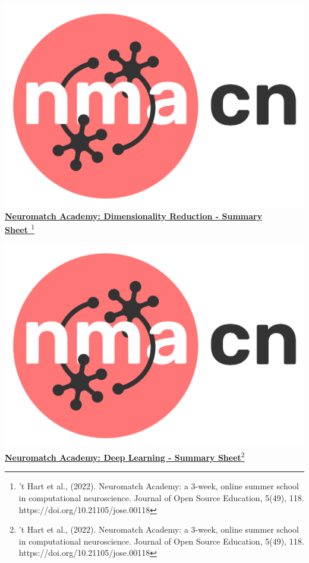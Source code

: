 \documentclass[10pt,a4paper]{article}
\begin{document}
\begin{multicols}{3}

\end{multicols}
\includegraphics[scale=0.03]{Figures/NMACN.png}\href{https://compneuro.neuromatch.io/tutorials/intro.html}{\textbf{\Huge{Neuromatch Academy: Dimensionality Reduction - Summary\\ Sheet }}\footnote{’t Hart et al., (2022). Neuromatch Academy: a 3-week, online summer school in computational neuroscience. Journal of Open Source Education, 5(49), 118. https://doi.org/10.21105/jose.00118}}
\begin{multicols}{3}

\end{multicols}
\newpage
\includegraphics[scale=0.03]{Figures/NMACN.png}\href{https://compneuro.neuromatch.io/tutorials/intro.html}{\textbf{\Huge{Neuromatch Academy: Deep Learning - Summary Sheet}}\footnote{’t Hart et al., (2022). Neuromatch Academy: a 3-week, online summer school in computational neuroscience. Journal of Open Source Education, 5(49), 118. https://doi.org/10.21105/jose.00118}}
\begin{multicols}{3}

\end{multicols}
\end{document}
